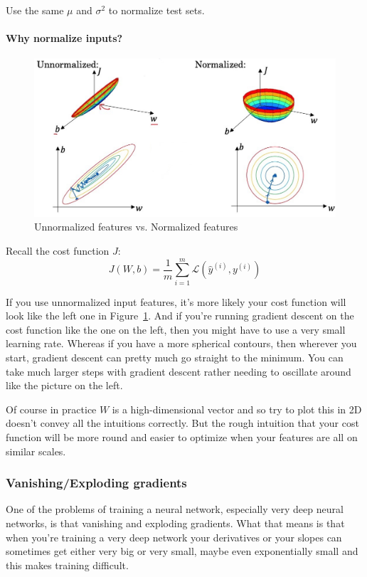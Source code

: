 \documentclass[UTF8]{article}
\newcommand{\Vector}[1]{\boldsymbol{\mathit{#1}}}   %
\newcommand{\Matrix}[1]{\boldsymbol{\mathit{#1}}}   %
\newcommand{\Cal}[1]{\mathcal{#1}}                  %
\begin{document}
Use the same $\mu$ and $\sigma^2$ to normalize test sets.

\paragraph{Why normalize inputs?}

\begin{figure}[htb]
    \centering
    \includegraphics[width=40em]{figures/normalization}
    \caption{Unnormalized features vs. Normalized features}
    \label{fig:normalization}
\end{figure}

Recall the cost function $J$:
$$ J(\Matrix{W}, \Vector{b}) = \frac{1}{m} \sum_{i=1}^m \Cal{L}(\hat{y}^{(i)}, y^{(i)}) $$

If you use unnormalized input features, it's more likely your cost function will look like the left
one in Figure~\ref{fig:normalization}. And if you're running gradient descent on the cost function
like the one on the left, then you might have to use a very small learning rate. Whereas if you
have a more spherical contours, then wherever you start, gradient descent can pretty much go
straight to the minimum. You can take much larger steps with gradient descent rather needing to
oscillate around like the picture on the left.

Of course in practice $W$ is a high-dimensional vector and so try to plot this in 2D doesn't convey
all the intuitions correctly. But the rough intuition that your cost function will be more round
and easier to optimize when your features are all on similar scales.

\subsubsection{Vanishing/Exploding gradients}
One of the problems of training a neural network, especially very deep neural networks, is that
vanishing and exploding gradients. What that means is that when you're training a very deep network
your derivatives or your slopes can sometimes get either very big or very small, maybe even
exponentially small and this makes training difficult.
\end{document}
